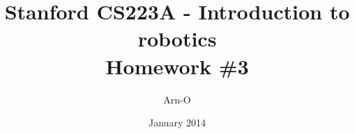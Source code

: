 \documentclass{exam}
\begin{document}
\title{Stanford CS223A - Introduction to robotics \\
  Homework \#3}
\author{Arn-O}
\date{January 2014}
\maketitle

\begin{questions}

\question


\end{questions}
\end{document}
